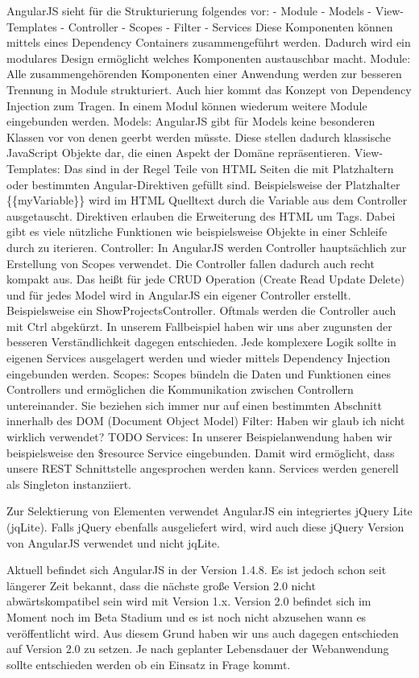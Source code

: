 AngularJS sieht für die Strukturierung folgendes vor: - Module - Models
- View-Templates - Controller - Scopes - Filter - Services Diese
Komponenten können mittels eines Dependency Containers zusammengeführt
werden. Dadurch wird ein modulares Design ermöglicht welches Komponenten
austauschbar macht. Module: Alle zusammengehörenden Komponenten einer
Anwendung werden zur besseren Trennung in Module strukturiert. Auch hier
kommt das Konzept von Dependency Injection zum Tragen. In einem Modul
können wiederum weitere Module eingebunden werden. Models: AngularJS
gibt für Models keine besonderen Klassen vor von denen geerbt werden
müsste. Diese stellen dadurch klassische JavaScript Objekte dar, die
einen Aspekt der Domäne repräsentieren. View-Templates: Das sind in der
Regel Teile von HTML Seiten die mit Platzhaltern oder bestimmten
Angular-Direktiven gefüllt sind. Beispielsweise der Platzhalter
\{\{myVariable\}\} wird im HTML Quelltext durch die Variable aus dem
Controller ausgetauscht. Direktiven erlauben die Erweiterung des HTML um
Tags. Dabei gibt es viele nützliche Funktionen wie beispielsweise
Objekte in einer Schleife durch zu iterieren. Controller: In AngularJS
werden Controller hauptsächlich zur Erstellung von Scopes verwendet. Die
Controller fallen dadurch auch recht kompakt aus. Das heißt für jede
CRUD Operation (Create Read Update Delete) und für jedes Model wird in
AngularJS ein eigener Controller erstellt. Beispielsweise ein
ShowProjectsController. Oftmals werden die Controller auch mit Ctrl
abgekürzt. In unserem Fallbeispiel haben wir uns aber zugunsten der
besseren Verständlichkeit dagegen entschieden. Jede komplexere Logik
sollte in eigenen Services ausgelagert werden und wieder mittels
Dependency Injection eingebunden werden. Scopes: Scopes bündeln die
Daten und Funktionen eines Controllers und ermöglichen die Kommunikation
zwischen Controllern untereinander. Sie beziehen sich immer nur auf
einen bestimmten Abschnitt innerhalb des DOM (Document Object Model)
Filter: Haben wir glaub ich nicht wirklich verwendet? TODO Services: In
unserer Beispielanwendung haben wir beispielsweise den \$resource
Service eingebunden. Damit wird ermöglicht, dass unsere REST
Schnittstelle angesprochen werden kann. Services werden generell als
Singleton instanziiert.

Zur Selektierung von Elementen verwendet AngularJS ein integriertes
jQuery Lite (jqLite). Falls jQuery ebenfalls ausgeliefert wird, wird
auch diese jQuery Version von AngularJS verwendet und nicht jqLite.

Aktuell befindet sich AngularJS in der Version 1.4.8. Es ist jedoch
schon seit längerer Zeit bekannt, dass die nächste große Version 2.0
nicht abwärtskompatibel sein wird mit Version 1.x. Version 2.0 befindet
sich im Moment noch im Beta Stadium und es ist noch nicht abzusehen wann
es veröffentlicht wird. Aus diesem Grund haben wir uns auch dagegen
entschieden auf Version 2.0 zu setzen. Je nach geplanter Lebensdauer der
Webanwendung sollte entschieden werden ob ein Einsatz in Frage kommt.

